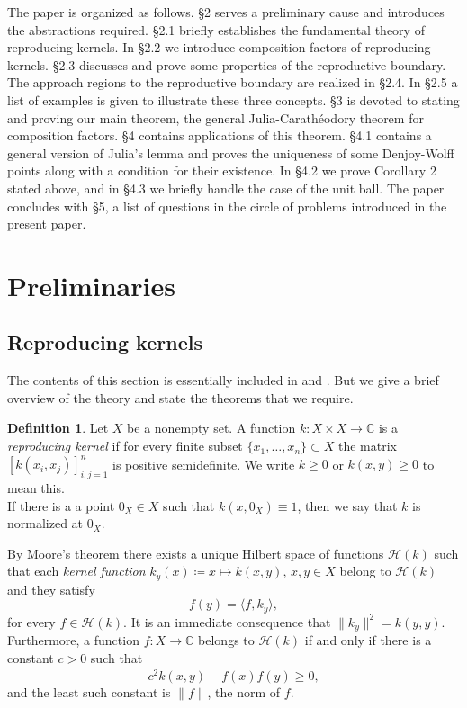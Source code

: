 \documentclass[leqno, final]{article}
\theoremstyle{definition}
\newtheorem{definition}{Definition}
\newcommand{\plane}{\mathbb{C}}
\newcommand{\Hilbert}{\mathcal{H}}
\newcommand{\la}{\langle}
\newcommand{\ra}{\rangle}
\begin{document}
The paper is organized as follows. \S2 serves a preliminary cause and
introduces the abstractions required. \S2.1 briefly establishes the fundamental theory of
reproducing kernels. In \S2.2 we introduce composition factors of reproducing
kernels. \S2.3 discusses and prove some properties of the reproductive boundary.
The approach regions to the reproductive boundary are realized in \S2.4.
In \S2.5 a list of examples is given to illustrate these three concepts.
\S3 is devoted to stating and proving our main theorem,
the general Julia-Carathéodory theorem for composition factors.
\S4 contains applications of this theorem. \S4.1 contains a general
version of Julia's lemma and proves the  uniqueness of some Denjoy-Wolff points
along with a condition for their existence. In \S4.2 we prove Corollary 2 stated
above, and in \S4.3 we briefly handle the case of the unit ball. The paper
concludes with \S5, a list of questions in the circle of problems introduced in
the present paper.

\section{Preliminaries}

\subsection{Reproducing kernels}
The contents of this section is essentially included in \cite{aronszajn} and \cite{paulsen}.
But we give a brief overview of the theory and state the theorems that we require.

\begin{definition}
Let $X$ be a nonempty set. A function $k:X\times X\to\plane$ is a \emph{reproducing kernel}
if for every finite subset $\{x_1,\ldots,x_n\}\subset X$ the matrix $[k(x_i,x_j)]_{i,j=1}^n$
is positive semidefinite. We write $k\geq0$ or $k(x,y)\geq0$ to mean this.
\\ If there is a a point $0_X\in X$ such that $k(x,0_X)\equiv1$, then we say that $k$ is
normalized at $0_X$.
\end{definition}
By Moore's theorem there exists a unique Hilbert space of functions $\Hilbert(k)$ such
that each \emph{kernel function} $k_y(x) \coloneq x\mapsto k(x,y),\,x,y\in X$ belong to
$\Hilbert(k)$ and they satisfy \[
	f(y) = \la f,k_y\ra,
\]
for every $f\in\Hilbert(k)$. It is an immediate consequence that $\|k_y\|^2=k(y,y)$.
Furthermore, a function $f:X\to\plane$ belongs to $\Hilbert(k)$ if and only if there
is a constant $c>0$ such that \begin{equation}\label{inclusion-criterion}
	c^2k(x,y) - f(x)\overline{f(y)} \geq 0,
\end{equation}
and the least such constant is $\|f\|$, the norm of $f$.
\end{document}
